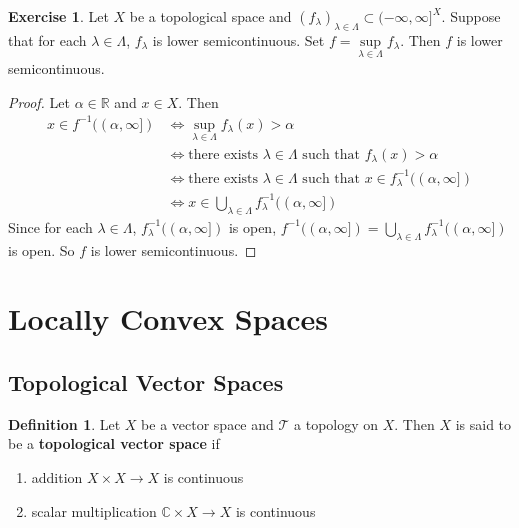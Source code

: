 \documentclass[12pt]{amsart}
\theoremstyle{definition}
\newtheorem{defn}[definition]{Definition}
\newtheorem{ex}[definition]{Exercise}
\newcommand{\al}{\alpha}
\newcommand{\lam}{\lambda}
\newcommand{\Lam}{\Lambda}
\newcommand{\C}{\mathbb{C}}
\newcommand{\R}{\mathbb{R}}
\newcommand{\MT}{\mathcal{T}}
\newcommand{\lsc}{lower semicontinuous}
\begin{document}
	\begin{ex}
		Let $X$ be a topological space and $ (f_{\lam})_{\lam \in \Lam} \subset (-\infty, \infty]^X$. Suppose that for each $\lam \in \Lam$, $f_\lam$ is \lsc. Set $f = \sup\limits_{\lam \in \Lam} f_{\lam}$. Then $f$ is \lsc.
	\end{ex}

	\begin{proof}
		Let $\al \in \R$ and $x \in X$. Then 
		\begin{align*}
			x \in f^{-1}((\al, \infty])
			& \iff \sup_{\lam \in \Lam} f_{\lam}(x) > \al \\
			& \iff \text{there exists $\lam \in \Lam$ such that } f_{\lam}(x) > \al \\
			& \iff \text{there exists $\lam \in \Lam$ such that } x \in f_{\lam}^{-1}((\al, \infty]) \\
			& \iff x \in \bigcup_{\lam \in \Lam} f_{\lam}^{-1}((\al, \infty])
		\end{align*}
		Since for each $\lam \in \Lam$, $f_{\lam}^{-1}((\al, \infty])$ is open, $f^{-1}((\al, \infty]) = \bigcup\limits_{\lam \in \Lam} f_{\lam}^{-1}((\al, \infty])$ is open. So $f$ is \lsc.
	\end{proof}
























	\newpage
	\section{Locally Convex Spaces}
	
	\subsection{Topological Vector Spaces}
	
	\begin{defn}
		Let $X$ be a vector space and $\MT$ a topology on $X$. Then $X$ is said to be a \textbf{topological vector space} if
		\begin{enumerate}
			\item  addition $X \times X \rightarrow X$ is continuous  \item scalar multiplication $\C \times X \rightarrow X$ is continuous
		\end{enumerate}
	\end{defn}
	
\end{document}
